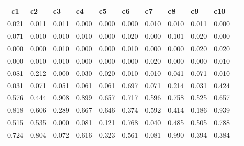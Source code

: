 \begin{table}[htbp]
\begin{tabular}{|l|l|l|l|l|l|l|l|l|l|l|}\hline  
 \multicolumn{1}{c}{ c1 }  & c2  & c3  & c4  & c5  & c6  & c7  & c8  & c9  & c10  \\ \hline  
    0.021 &     0.011 &     0.011 &     0.000 &     0.000 &     0.000 &     0.010 &     0.010 &     0.011 &     0.000 \\ \hline 
    0.071 &     0.010 &     0.010 &     0.010 &     0.000 &     0.020 &     0.000 &     0.101 &     0.020 &     0.000 \\ \hline 
    0.000 &     0.000 &     0.010 &     0.000 &     0.000 &     0.010 &     0.000 &     0.000 &     0.020 &     0.020 \\ \hline 
    0.000 &     0.010 &     0.010 &     0.000 &     0.000 &     0.000 &     0.020 &     0.000 &     0.000 &     0.010 \\ \hline 
    0.081 &     0.212 &     0.000 &     0.030 &     0.020 &     0.010 &     0.010 &     0.041 &     0.071 &     0.010 \\ \hline 
    0.031 &     0.071 &     0.051 &     0.061 &     0.061 &     0.697 &     0.071 &     0.214 &     0.031 &     0.424 \\ \hline 
    0.576 &     0.444 &     0.908 &     0.899 &     0.657 &     0.717 &     0.596 &     0.758 &     0.525 &     0.657 \\ \hline 
    0.818 &     0.606 &     0.289 &     0.667 &     0.646 &     0.374 &     0.592 &     0.414 &     0.186 &     0.939 \\ \hline 
    0.515 &     0.535 &     0.000 &     0.081 &     0.121 &     0.768 &     0.040 &     0.485 &     0.505 &     0.788 \\ \hline 
    0.724 &     0.804 &     0.072 &     0.616 &     0.323 &     0.561 &     0.081 &     0.990 &     0.394 &     0.384 \\ \hline 
  \end{tabular}
\end{table}
